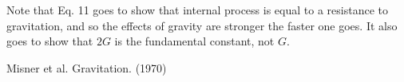 \documentclass[12pt]{article}
\begin{document}
Note that Eq. 11 goes to show that internal process is equal to a resistance to gravitation, and so the effects of gravity are stronger the faster one goes.
It also goes to show that $2G$ is the fundamental constant, not $G$.





\begin{thebibliography}{9}


 Misner et al. Gravitation. (1970)






\end{thebibliography}
\end{document}
